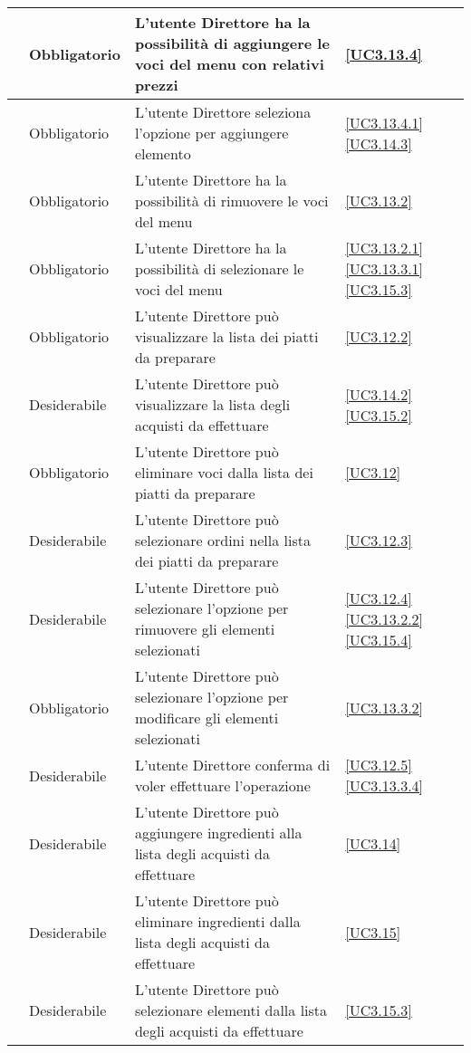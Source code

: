 \begin{longtable}{|P{1.5cm}|P{2.5cm}|P{6.5cm}|P{2.5cm}|}
	\hline \RequisitoObF\label{L79} & Obbligatorio & L'utente Direttore ha la possibilità di aggiungere le voci del menu con relativi prezzi & \ref{UC3.13.4} \\
	\hline \RequisitoObF\label{L108} & Obbligatorio & L'utente Direttore seleziona l'opzione per aggiungere elemento & \ref{UC3.13.4.1} \ref{UC3.14.3}\\
	\hline \RequisitoObF\label{L80} & Obbligatorio & L'utente Direttore ha la possibilità di rimuovere le voci del menu & \ref{UC3.13.2} \\
	\hline \RequisitoObF\label{L106} & Obbligatorio & L'utente Direttore ha la possibilità di selezionare le voci del menu & \ref{UC3.13.2.1} \ref{UC3.13.3.1} \ref{UC3.15.3}\\
	\hline \RequisitoObF\label{L30} & Obbligatorio & L'utente Direttore può visualizzare la lista dei piatti da preparare & \ref{UC3.12.2} \\
	\hline \RequisitoDF\label{L31} & Desiderabile & L'utente Direttore può visualizzare la lista degli acquisti da effettuare & \ref{UC3.14.2} \ref{UC3.15.2} \\
	\hline \RequisitoObF\label{L32} & Obbligatorio & L'utente Direttore può eliminare voci dalla lista dei piatti da preparare & \ref{UC3.12} \\
	\hline \RequisitoDF\label{L101} & Desiderabile & L'utente Direttore può selezionare ordini nella lista dei piatti da preparare & \ref{UC3.12.3} \\
	\hline \RequisitoDF\label{L102} & Desiderabile & L'utente Direttore può selezionare l'opzione per rimuovere gli elementi selezionati & \ref{UC3.12.4} \ref{UC3.13.2.2} \ref{UC3.15.4}\\
	\hline \RequisitoObF\label{L107} & Obbligatorio & L'utente Direttore può selezionare l'opzione per modificare gli elementi selezionati & \ref{UC3.13.3.2} \\
	\hline \RequisitoDF\label{L103} & Desiderabile & L'utente Direttore conferma di voler effettuare l'operazione & \ref{UC3.12.5} \ref{UC3.13.3.4} \\
	\hline \RequisitoDF\label{L53} & Desiderabile & L'utente Direttore può aggiungere ingredienti alla lista degli acquisti da effettuare & \ref{UC3.14}\\
	 \hline \RequisitoDF\label{L65} & Desiderabile & L'utente Direttore può eliminare ingredienti dalla lista degli acquisti da effettuare & \ref{UC3.15} \\
	\hline \RequisitoDF\label{L109} & Desiderabile & L'utente Direttore può selezionare elementi dalla lista degli acquisti da effettuare & \ref{UC3.15.3} \\

\end{longtable}
